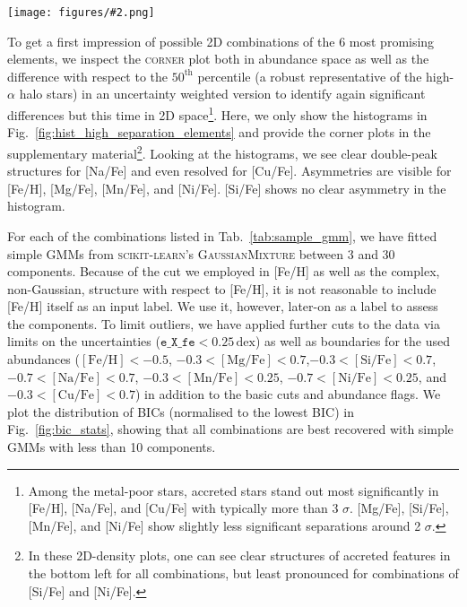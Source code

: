 \documentclass[fleqn,usenatbib]{mnras}
\newcommand{\dex}{\,\mathrm{dex}}	%
\newcommand{\codeicon}{{\faCloudDownload}}
\newcommand{\codelink}[1]{\href{https://github.com/svenbuder/buder_galah_accreted_chemistry/tree/main/figures/#1.ipynb}{\codeicon}\,\,}
\newcommand{\oscaption}[2]{\caption{#2 \codelink{#1}}}
\newcommand{\figuretextwidth}[4]{\begin{figure*} \centering \texttt{[image: figures/\#2.png]}\oscaption{#3}{#4}\label{fig:#2} \end{figure*}}
\begin{document}
\figuretextwidth{17cm}{hist_high_separation_elements}{gaussian_mixture_models}{
\textbf{Histograms of [Fe/H], [Mg/Fe], [Si/Fe], [Na/Fe], [Mn/Fe], [Ni/Fe], and [Cu/Fe] for stars with $\mathrm{[Fe/H]} < -0.6$ which passed the basic quality cuts (Eq.~\ref{eq:basic_cuts})}.
Only stars with unflagged measurements for all these elements are shown. Extensive \textsc{corner} plots are provided in the supplementary material.
}

To get a first impression of possible 2D combinations of the 6 most promising elements, we inspect the \textsc{corner} plot \citep{corner} both in abundance space as well as the difference with respect to the $50^\text{th}$ percentile (a robust representative of the high-$\alpha$ halo stars) in an uncertainty weighted version to identify again significant differences but this time in 2D space\footnote{Among the metal-poor stars, accreted stars stand out most significantly in [Fe/H], [Na/Fe], and [Cu/Fe] with typically more than 3 $\sigma$. [Mg/Fe], [Si/Fe], [Mn/Fe], and [Ni/Fe] show slightly less significant separations around 2 $\sigma$.}. Here, we only show the histograms in Fig.~\ref{fig:hist_high_separation_elements} and provide the corner plots in the supplementary material\footnote{In these 2D-density plots, one can see clear structures of accreted features in the bottom left for all combinations, but least pronounced for combinations of [Si/Fe] and [Ni/Fe].}. Looking at the histograms, we see clear double-peak structures for [Na/Fe] and even resolved for [Cu/Fe]. Asymmetries are visible for [Fe/H], [Mg/Fe], [Mn/Fe], and [Ni/Fe]. [Si/Fe] shows no clear asymmetry in the histogram.

For each of the combinations listed in Tab.~\ref{tab:sample_gmm}, we have fitted simple GMMs from \textsc{scikit-learn}'s \textsc{GaussianMixture} between 3 and 30 components. Because of the cut we employed in [Fe/H] as well as the complex, non-Gaussian, structure with respect to [Fe/H], it is not reasonable to include [Fe/H] itself as an input label. We use it, however, later-on as a label to assess the components. To limit outliers, we have applied further cuts to the data via limits on the uncertainties ($\texttt{e\_X\_fe} < 0.25\dex$) as well as boundaries for the used abundances ($ \mathrm{[Fe/H]} < -0.5 $, $-0.3 < \mathrm{[Mg/Fe]} < 0.7$,$ -0.3 < \mathrm{[Si/Fe]} < 0.7$, $ -0.7 < \mathrm{[Na/Fe]} < 0.7$, $ -0.3 < \mathrm{[Mn/Fe]} < 0.25$, $ -0.7 < \mathrm{[Ni/Fe]} < 0.25$, and $ -0.3 < \mathrm{[Cu/Fe]} < 0.7$) in addition to the basic cuts and abundance flags. We plot the distribution of BICs (normalised to the lowest BIC) in Fig.~\ref{fig:bic_stats}, showing that all combinations are best recovered with simple GMMs with less than 10 components.
\end{document}
